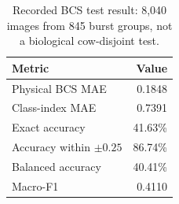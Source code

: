 \begin{table}[htbp]
\centering\small
\caption[Recorded BCS baseline results]{Recorded BCS test result: 8,040 images from 845 burst groups, not a biological cow-disjoint test.}\label{tab:bcsresults}
\begin{tabular}{lr}
\toprule
Metric & Value \\
\midrule
Physical BCS MAE & 0.1848 \\
Class-index MAE & 0.7391 \\
Exact accuracy & 41.63\% \\
Accuracy within $\pm0.25$ & 86.74\% \\
Balanced accuracy & 40.41\% \\
Macro-F1 & 0.4110 \\
\bottomrule
\end{tabular}
\end{table}
